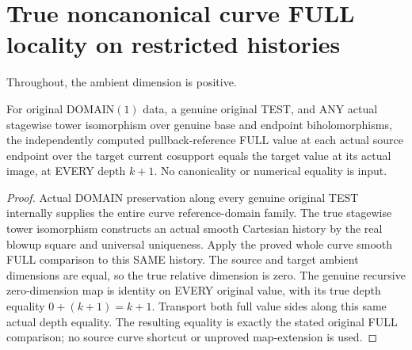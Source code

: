 \section{True noncanonical curve FULL locality on restricted histories}

Throughout, the ambient dimension is positive.

\begin{theorem}
\label{hir:original-curve-any-test-full-tower-isomorphism}
\leanok
For original DOMAIN$(1)$ data, a genuine original TEST, and ANY actual
stagewise tower isomorphism over genuine base and endpoint
biholomorphisms, the independently computed pullback-reference FULL
value at each actual source endpoint over the target current cosupport
equals the target value at its actual image, at EVERY depth $k+1$.
No canonicality or numerical equality is input.
\end{theorem}
\begin{proof}
Actual DOMAIN preservation along every genuine original TEST internally
supplies the entire curve reference-domain family. The true stagewise
tower isomorphism constructs an actual smooth Cartesian history by the
real blowup square and universal uniqueness. Apply the proved whole curve
smooth FULL comparison to this SAME history. The source and target
ambient dimensions are equal, so the true relative dimension is zero.
The genuine recursive zero-dimension map is identity on EVERY original
value, with its true depth equality $0+(k+1)=k+1$. Transport both full
value sides along this same actual depth equality. The resulting equality
is exactly the stated original FULL comparison; no source curve shortcut
or unproved map-extension is used.
\end{proof}

